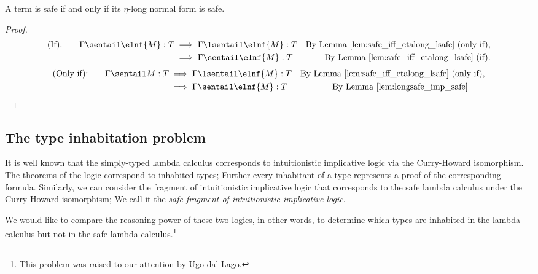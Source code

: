 \begin{proposition}
\label{prop:safe_iff_elnfsafe}
A term is safe if and only if its $\eta$-long normal form is safe.
\end{proposition}
\begin{proof}
\begin{align*}
  \mbox{(If):}\qquad  \Gamma \sentail \elnf{M}:T &\implies   \Gamma \lsentail \elnf{M}:T &  \mbox{By Lemma \ref{lem:safe_iff_etalong_lsafe} (only if),} \\
  &\implies   \Gamma \sentail \elnf{M}:T &  \mbox{By Lemma \ref{lem:safe_iff_etalong_lsafe} (if).}
\end{align*}
\begin{align*}
  \mbox{(Only if):}\qquad \Gamma \sentail M:T &\implies   \Gamma \lsentail \elnf{M}:T &  \mbox{By Lemma \ref{lem:safe_iff_etalong_lsafe} (only if),} \\
  &\implies \Gamma \sentail \elnf{M}:T &  \mbox{By Lemma \ref{lem:longsafe_imp_safe}\qquad  }
\end{align*}
\qedhere
\end{proof}


\subsection*{The type inhabitation problem}

It is well known that the simply-typed lambda calculus corresponds
to intuitionistic implicative logic via the Curry-Howard
isomorphism. The theorems of the logic correspond to inhabited
types; Further every inhabitant of a type represents a proof of the
corresponding formula. Similarly, we can consider the fragment of
intuitionistic implicative logic that corresponds to the safe lambda
calculus under the Curry-Howard isomorphism; We call it the
\emph{safe fragment of intuitionistic implicative logic}.

We would like to compare the reasoning power of these
two logics, in other words, to determine which types are inhabited
in the lambda calculus but not in the safe lambda
calculus.\footnote{This problem was raised to our attention by Ugo
dal Lago.}

